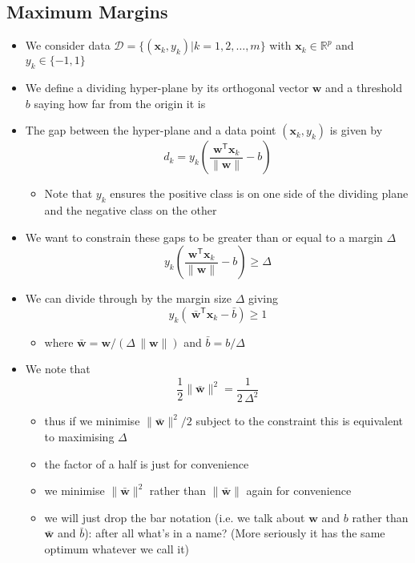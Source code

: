 \documentclass[11pt]{article}
\newcommand{\tr}{\textsf{T}}
\begin{document}
\subsection{Maximum Margins}
\label{sec:org356a29d}
\begin{itemize}
\item We consider data \(\mathcal{D} = \{(\bm{x}_k,y_k) | k=1,2,\ldots,
     m\}\) with \(\bm{x}_k \in \mathbb{R}^p\) and \(y_k\in\{-1,1\}\)
\item We define a dividing hyper-plane by its orthogonal vector
\(\bm{w}\) and a threshold \(b\) saying how far from the origin it is
\item The gap between the hyper-plane and a data point \((\bm{x}_k,y_k)\)
is given by
$$ d_k = y_k \left(\frac{ \bm{w}^\tr \bm{x}_k}{\|\bm{w}\|} -b \right) $$
\begin{itemize}
\item Note that \(y_k\) ensures the positive class is on one side of
the dividing plane and the negative class on the other
\end{itemize}
\item We want to constrain these gaps to be greater than or equal to a margin
\(\Delta\)
$$ y_k \left(\frac{ \bm{w}^\tr \bm{x}_k}{\|\bm{w}\|} -b \right)
     \geq \Delta $$
\item We can divide through by the margin size \(\Delta\) giving
$$ y_k \left(\ \bar{\bm{w}}^\tr \bm{x}_k - \bar{b} \right) \geq 1 $$
\begin{itemize}
\item where \(\bar{\bm{w}} = \bm{w}/(\Delta\,\|\bm{w}\|)\) and \(\bar{b}
       = b/\Delta\)
\end{itemize}
\item We note that
$$ \frac{1}{2} \| \bar{\bm{w}}\|^2 = \frac{1}{2\,\Delta^2} $$
\begin{itemize}
\item thus if we minimise \(\| \bar{\bm{w}}\|^2/2\) subject to the
constraint this is equivalent to maximising \(\Delta\)
\item the factor of a half is just for convenience
\item we minimise \(\| \bar{\bm{w}}\|^2\) rather than \(\| \bar{\bm{w}}\|\)
again for convenience
\item we will just drop the bar notation (i.e. we talk about \(\bm{w}\) and \(b\)
rather than \(\bar{\bm{w}}\) and \(\bar{b}\)): after all what's in
a name? (More seriously it has the same optimum whatever we
call it)
\end{itemize}

\end{itemize}
\end{document}
